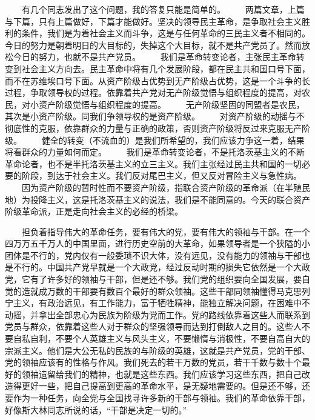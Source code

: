 \documentclass[twocolumn]{cvertbook}
\begin{document}
　　有几个同志发出了这个问题，我的答复只能是简单的。
　　两篇文章，上篇与下篇，只有上篇做好，下篇才能做好。坚决的领导民主革命，是争取社会主义胜利的条件，我们是为着社会主义而斗争，这是与任何革命的三民主义者不相同的。今日的努力是朝着明日的大目标的，失掉这个大目标，就不是共产党员了。然而放松今日的努力，也就不是共产党员。
　　我们是革命转变论者，主张民主革命转变到社会主义方向去。民主革命中将有几个发展阶段，都在民主共和国口号下面，而不在苏维埃口号下面。从资产阶级占优势到无产阶级占优势，这是一个斗争的长过程，争取领导权的过程。依靠着共产党对无产阶级觉悟与组织程度的提高，对农民，对小资产阶级觉悟与组织程度的提高。
　　无产阶级坚固的同盟者是农民，其次是小资产阶级。同我们争领导权的是资产阶级。
　　对资产阶级的动摇与不彻底性的克服，依靠群众的力量与正确的政策，否则资产阶级将反过来克服无产阶级。
　　健全的转变（不流血的）是我们所希望的，我们应该力争这一着，结果将看群众的力量如何而定。
　　我们是革命转变论者，不是托洛茨基主义的不断革命论者，也不是半托洛茨基主义的立三主义。我们主张经过民主共和国的一切必要的阶段，到达于社会主义。我们反对尾巴主义，但又反对冒险主义与急性病。
　　因为资产阶级的暂时性而不要资产阶级，指联合资产阶级的革命派（在半殖民地）为投降主义，这是托洛茨基主义的说法，我们是不能同意的。今天的联合资产阶级革命派，正是走向社会主义的必经的桥梁。


　　担负着指导伟大的革命任务，要有伟大的党，要有伟大的领袖与干部。在一个四万万五千万人的中国里面，进行历史空前的大革命，如果领导者是一个狭隘的小团体是不行的，党内仅有一般委琐不识大体，没有远见，没有能力的领袖与干部也是不行的。中国共产党早就是一个大政党，经过反动时期的损失它依然是一个大政党，它有了许多好的领袖与干部，但是还不够。我们党的组织要向全国发展，要自觉的造就成万数的干部要有数百个最好的群众领袖。这些干部同领袖懂得马克思列宁主义，有政治远见，有工作能力，富于牺牲精神，能独立解决问题，在困难中不动摇，并拿出全部忠心为民族为阶级为党而工作。党的路线依靠着这些人而联系到党员与群众，依靠着这些人对于群众的坚强领导而达到打倒敌人之目的。这些人不要自私自利，不要个人英雄主义与风头主义，不要懒惰与消极性，不要自高自大的宗派主义。他们是大公无私的民族的与阶级的英雄，这就是共产党员，党的干部、党的领袖应该有的性格与作风。我们死去的若干万数的党员，若干千数与数十个最好的领袖遗留给我们的精神，也就是这些东西。我们应该学习这些东西，把自己改造得更好一些，把自己提高到更高的革命水平，是无疑地需要的。但是还不够，还要作为一种任务，向全党与全国找寻许多新的干部与领袖。我们的革命依靠干部，好像斯大林同志所说的话，“干部是决定一切的。”
\end{document}
